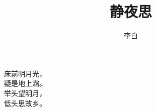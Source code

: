 \documentclass[b5paper, 12pt, onecolumn,oneside]{article}
\title{静夜思}
\author{李白}
\begin{document}
	\centering
	\maketitle
床前明月光，\\
疑是地上霜。\\
举头望明月，\\
低头思故乡。\\
\end{document}
